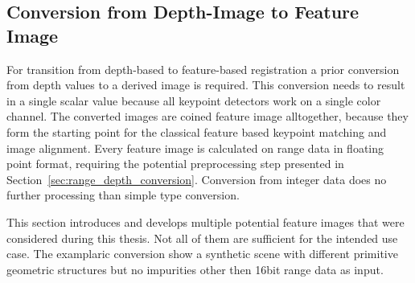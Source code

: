 \subsection{Conversion from Depth-Image to Feature Image}

For transition from depth-based to feature-based registration a prior conversion from depth values to a derived image is required.
This conversion needs to result in a single scalar value because all keypoint detectors work on a single color channel.
The converted images are coined feature image alltogether, because they form the starting point for the classical feature based keypoint matching and image alignment.
Every feature image is calculated on range data in floating point format, requiring the potential preprocessing step presented in Section~\ref{sec:range_depth_conversion}.
Conversion from integer data does no further processing than simple type conversion.

This section introduces and develops multiple potential feature images that were considered during this thesis.
Not all of them are sufficient for the intended use case.
The examplaric conversion show a synthetic scene with different primitive geometric structures but no impurities other then 16bit range data as input.






